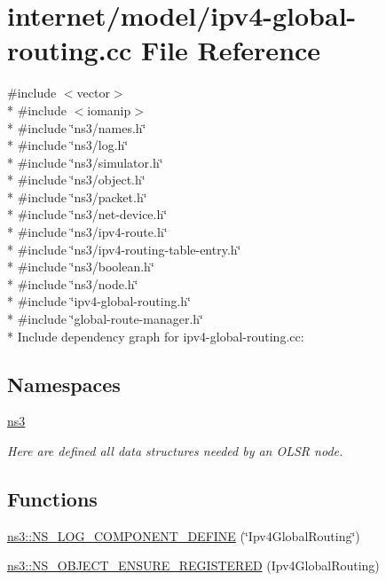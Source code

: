 \hypertarget{ipv4-global-routing_8cc}{}\section{internet/model/ipv4-\/global-\/routing.cc File Reference}
\label{ipv4-global-routing_8cc}
{\ttfamily \#include $<$vector$>$}\\*
{\ttfamily \#include $<$iomanip$>$}\\*
{\ttfamily \#include \char`\"{}ns3/names.\+h\char`\"{}}\\*
{\ttfamily \#include \char`\"{}ns3/log.\+h\char`\"{}}\\*
{\ttfamily \#include \char`\"{}ns3/simulator.\+h\char`\"{}}\\*
{\ttfamily \#include \char`\"{}ns3/object.\+h\char`\"{}}\\*
{\ttfamily \#include \char`\"{}ns3/packet.\+h\char`\"{}}\\*
{\ttfamily \#include \char`\"{}ns3/net-\/device.\+h\char`\"{}}\\*
{\ttfamily \#include \char`\"{}ns3/ipv4-\/route.\+h\char`\"{}}\\*
{\ttfamily \#include \char`\"{}ns3/ipv4-\/routing-\/table-\/entry.\+h\char`\"{}}\\*
{\ttfamily \#include \char`\"{}ns3/boolean.\+h\char`\"{}}\\*
{\ttfamily \#include \char`\"{}ns3/node.\+h\char`\"{}}\\*
{\ttfamily \#include \char`\"{}ipv4-\/global-\/routing.\+h\char`\"{}}\\*
{\ttfamily \#include \char`\"{}global-\/route-\/manager.\+h\char`\"{}}\\*
Include dependency graph for ipv4-\/global-\/routing.cc\+:
\subsection*{Namespaces}
\begin{DoxyCompactItemize}
\item 
 \hyperlink{namespacens3}{ns3}
\begin{DoxyCompactList}\small\item\em Here are defined all data structures needed by an O\+L\+SR node. \end{DoxyCompactList}\end{DoxyCompactItemize}
\subsection*{Functions}
\begin{DoxyCompactItemize}
\item 
\hyperlink{namespacens3_a5393dd8c266296d299c69053d519ffc5}{ns3\+::\+N\+S\+\_\+\+L\+O\+G\+\_\+\+C\+O\+M\+P\+O\+N\+E\+N\+T\+\_\+\+D\+E\+F\+I\+NE} (\char`\"{}Ipv4\+Global\+Routing\char`\"{})
\item 
\hyperlink{namespacens3_adebfcc9805901a94af316b9cf1944c1a}{ns3\+::\+N\+S\+\_\+\+O\+B\+J\+E\+C\+T\+\_\+\+E\+N\+S\+U\+R\+E\+\_\+\+R\+E\+G\+I\+S\+T\+E\+R\+ED} (Ipv4\+Global\+Routing)
\end{DoxyCompactItemize}
